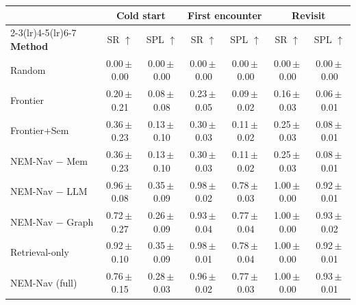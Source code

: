 \begin{tabular}{l@{\hspace{4pt}}cc@{\hspace{8pt}}cc@{\hspace{8pt}}cc}
\toprule
& \multicolumn{2}{c}{\textbf{Cold start}} & \multicolumn{2}{c}{\textbf{First encounter}} & \multicolumn{2}{c}{\textbf{Revisit}} \\
\cmidrule(lr){2-3}\cmidrule(lr){4-5}\cmidrule(lr){6-7}
\textbf{Method} & SR $\uparrow$ & SPL $\uparrow$ & SR $\uparrow$ & SPL $\uparrow$ & SR $\uparrow$ & SPL $\uparrow$ \\
\midrule
Random & 0.00\,$\pm$\,0.00 & 0.00\,$\pm$\,0.00 & 0.00\,$\pm$\,0.00 & 0.00\,$\pm$\,0.00 & 0.00\,$\pm$\,0.00 & 0.00\,$\pm$\,0.00 \\
Frontier & 0.20\,$\pm$\,0.21 & 0.08\,$\pm$\,0.08 & 0.23\,$\pm$\,0.05 & 0.09\,$\pm$\,0.02 & 0.16\,$\pm$\,0.03 & 0.06\,$\pm$\,0.01 \\
Frontier+Sem & 0.36\,$\pm$\,0.23 & 0.13\,$\pm$\,0.10 & 0.30\,$\pm$\,0.03 & 0.11\,$\pm$\,0.02 & 0.25\,$\pm$\,0.03 & 0.08\,$\pm$\,0.01 \\
NEM-Nav $-$ Mem & 0.36\,$\pm$\,0.23 & 0.13\,$\pm$\,0.10 & 0.30\,$\pm$\,0.03 & 0.11\,$\pm$\,0.02 & 0.25\,$\pm$\,0.03 & 0.08\,$\pm$\,0.01 \\
NEM-Nav $-$ LLM & 0.96\,$\pm$\,0.08 & 0.35\,$\pm$\,0.09 & 0.98\,$\pm$\,0.02 & 0.78\,$\pm$\,0.03 & 1.00\,$\pm$\,0.00 & 0.92\,$\pm$\,0.01 \\
NEM-Nav $-$ Graph & 0.72\,$\pm$\,0.27 & 0.26\,$\pm$\,0.09 & 0.93\,$\pm$\,0.04 & 0.77\,$\pm$\,0.04 & 1.00\,$\pm$\,0.00 & 0.93\,$\pm$\,0.02 \\
Retrieval-only & 0.92\,$\pm$\,0.10 & 0.35\,$\pm$\,0.09 & 0.98\,$\pm$\,0.01 & 0.78\,$\pm$\,0.04 & 1.00\,$\pm$\,0.00 & 0.92\,$\pm$\,0.01 \\
NEM-Nav (full) & 0.76\,$\pm$\,0.15 & 0.28\,$\pm$\,0.03 & 0.96\,$\pm$\,0.02 & 0.77\,$\pm$\,0.03 & 1.00\,$\pm$\,0.00 & 0.93\,$\pm$\,0.01 \\
\bottomrule
\end{tabular}
